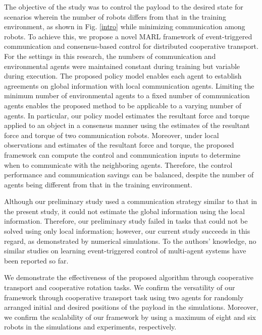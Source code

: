 \documentclass[letterpaper, 10 pt, conference]{ieeeconf} %
\begin{document}
The objective of the study was to control the payload to the desired state for scenarios wherein the number of robots differs from that in the training environment, as shown in Fig. \ref{intro} while minimizing communication among robots.
To achieve this, we propose a novel MARL framework of event-triggered communication and consensus-based control for distributed cooperative transport. For the settings in this research, the numbers of communication and environmental agents were maintained constant during training but variable during execution. The proposed policy model enables each agent to establish agreements on global information with local communication agents. Limiting the minimum number of environmental agents to a fixed number of communication agents enables the proposed method to be applicable to a varying number of agents. In particular, our policy model estimates the resultant force and torque applied to an object in a consensus manner \cite{Saber2004, Ren2005} using the estimates of the resultant force and torque of two communication robots.
Moreover, under local observations and estimates of the resultant force and torque, the proposed framework can compute the control and communication inputs to determine when to communicate with the neighboring agents.
Therefore, the control performance and communication savings can be balanced, despite the number of agents being different from that in the training environment.

Although our preliminary study \cite{Shibata2021} used a communication strategy similar to that in the present study, it could not estimate the global information using the local information. Therefore, our preliminary study failed in tasks that could not be solved using only local information; however, our current study succeeds in this regard, as demonstrated by numerical simulations.
To the authors' knowledge, no similar studies on learning event-triggered control of multi-agent systems have been reported so far.

We demonstrate the effectiveness of the proposed algorithm through cooperative transport and cooperative rotation tasks.
We confirm the versatility of our framework through cooperative transport task using two agents for randomly arranged initial and desired positions of the payload in the simulations.
Moreover, we confirm the scalability of our framework by using a maximum of eight and six robots in the simulations and experiments, respectively.
\end{document}

